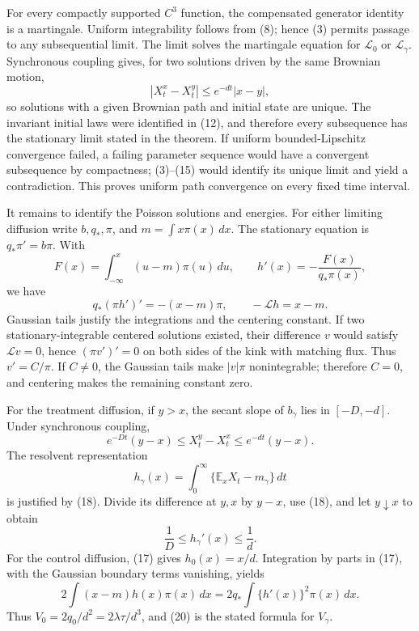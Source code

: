For every compactly supported \(C^3\) function, the compensated generator identity is a martingale.  Uniform integrability follows from (8); hence (3) permits passage to any subsequential limit.  The limit solves the martingale equation for \(\mathcal L_0\) or \(\mathcal L_\gamma\).  Synchronous coupling gives, for two solutions driven by the same Brownian motion,
\[
 |X_t^x-X_t^y|\leq e^{-dt}|x-y|,                              \tag{15}
\]
so solutions with a given Brownian path and initial state are unique.  The invariant initial laws were identified in (12), and therefore every subsequence has the stationary limit stated in the theorem.  If uniform bounded-Lipschitz convergence failed, a failing parameter sequence would have a convergent subsequence by compactness; (3)--(15) would identify its unique limit and yield a contradiction.  This proves uniform path convergence on every fixed time interval.

It remains to identify the Poisson solutions and energies.  For either limiting diffusion write \(b,q_*,\pi\), and \(m=\int x\pi(x)\,dx\).  The stationary equation is \(q_*\pi'=b\pi\).  With
\[
 F(x)=\int_{-\infty}^x(u-m)\pi(u)\,du,
 \qquad h'(x)=-\frac{F(x)}{q_*\pi(x)},                         \tag{16}
\]
we have
\[
 q_*(\pi h')'=-(x-m)\pi,
 \qquad -\mathcal Lh=x-m.                                    \tag{17}
\]
Gaussian tails justify the integrations and the centering constant.  If two stationary-integrable centered solutions existed, their difference \(v\) would satisfy \(\mathcal Lv=0\), hence \((\pi v')'=0\) on both sides of the kink with matching flux.  Thus \(v'=C/\pi\).  If \(C\ne0\), the Gaussian tails make \(|v|\pi\) nonintegrable; therefore \(C=0\), and centering makes the remaining constant zero.

For the treatment diffusion, if \(y>x\), the secant slope of \(b_\gamma\) lies in \([-D,-d]\).  Under synchronous coupling,
\[
 e^{-Dt}(y-x)\leq X_t^y-X_t^x\leq e^{-dt}(y-x).                \tag{18}
\]
The resolvent representation
\[
 h_\gamma(x)=\int_0^\infty\{\mathbb E_xX_t-m_\gamma\}\,dt
\]
is justified by (18).  Divide its difference at \(y,x\) by \(y-x\), use (18), and let \(y\downarrow x\) to obtain
\[
 \frac1D\leq h_\gamma'(x)\leq\frac1d.                       \tag{19}
\]
For the control diffusion, (17) gives \(h_0(x)=x/d\).  Integration by parts in (17), with the Gaussian boundary terms vanishing, yields
\[
 2\int(x-m)h(x)\pi(x)\,dx
 =2q_*\int\{h'(x)\}^2\pi(x)\,dx.                             \tag{20}
\]
Thus \(V_0=2q_0/d^2=2\lambda\tau/d^3\), and (20) is the stated formula for \(V_\gamma\).

